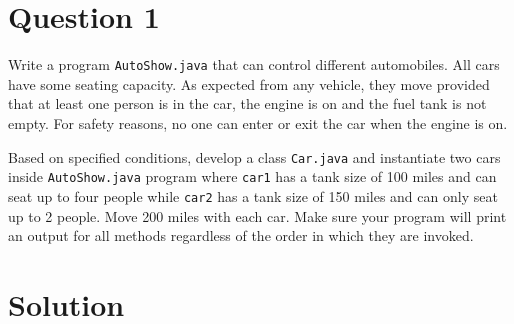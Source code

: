 \section*{Question 1}

Write a program \texttt{AutoShow.java} that can control different automobiles. All cars have some seating capacity. As expected from any vehicle, they move provided that at least one person is in the car, the engine is on and the fuel tank is not empty. For safety reasons, no one can enter or exit the car when the engine is on.

Based on specified conditions, develop a class \texttt{Car.java} and instantiate two cars inside \texttt{AutoShow.java} program where \texttt{car1} has a tank size of 100 miles and can seat up to four people while \texttt{car2} has a tank size of 150 miles and can only seat up to 2 people. Move 200 miles with each car. Make sure your program will print an output for all methods regardless of the order in which they are invoked.

\section*{Solution}

